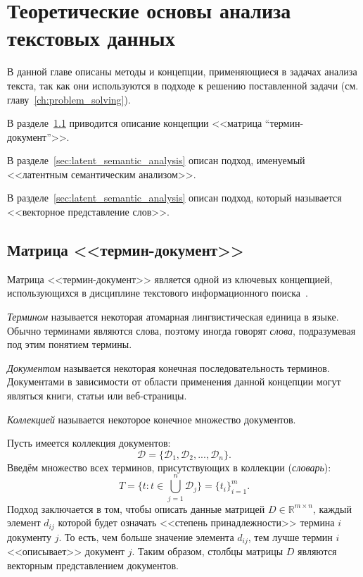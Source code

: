 \chapter{Теоретические основы анализа текстовых данных}

В данной главе описаны методы и концепции, применяющиеся в
задачах анализа текста, так как они используются в подходе
к решению поставленной задачи (см. главу~\ref{ch:problem_solving}).

В разделе~\ref{sec:term_document_matrix} приводится описание
концепции <<матрица “термин-документ”>>.

В разделе~\ref{sec:latent_semantic_analysis} описан подход,
именуемый <<латентным семантическим анализом>>.

В разделе~\ref{sec:latent_semantic_analysis} описан подход,
который называется <<векторное представление слов>>.

\section{Матрица <<термин-документ>>}
\label{sec:term_document_matrix}

Матрица <<термин-документ>> является одной из ключевых концепцией,
использующихся в дисциплине текстового информационного 
поиска~\cite{manning2008introduction}. 

\textit{Термином} называется некоторая атомарная лингвистическая
единица в языке. Обычно терминами являются слова, поэтому иногда
говорят \textit{слова}, подразумевая под этим понятием термины.

\textit{Документом} называется некоторая конечная последовательность
терминов. Документами в зависимости от области применения данной концепции
могут являться книги, статьи или веб-страницы.

\textit{Коллекцией} называется некоторое конечное множество документов.

Пусть имеется коллекция документов:
\[
    \mathcal{D} = \{\mathcal{D}_1, \mathcal{D}_2,...,\mathcal{D}_n\}.
\]
Введём множество всех терминов, присутствующих в коллекции (\textit{словарь}):
\[
    T = \{t \colon t \in \bigcup_{j=1}^{n} \mathcal{D}_j\} = \{t_i\}_{i=1}^{m}.
\]
Подход заключается в том, чтобы описать данные матрицей 
$D \in \mathbb{R}^{m \times n}$, каждый элемент $d_{ij}$ которой будет
означать <<степень принадлежности>> термина $i$ документу $j$. То есть,
чем больше значение элемента $d_{ij}$, тем лучше термин $i$ <<описывает>>
документ $j$. Таким образом, столбцы матрицы $D$ являются векторным
представлением документов.

